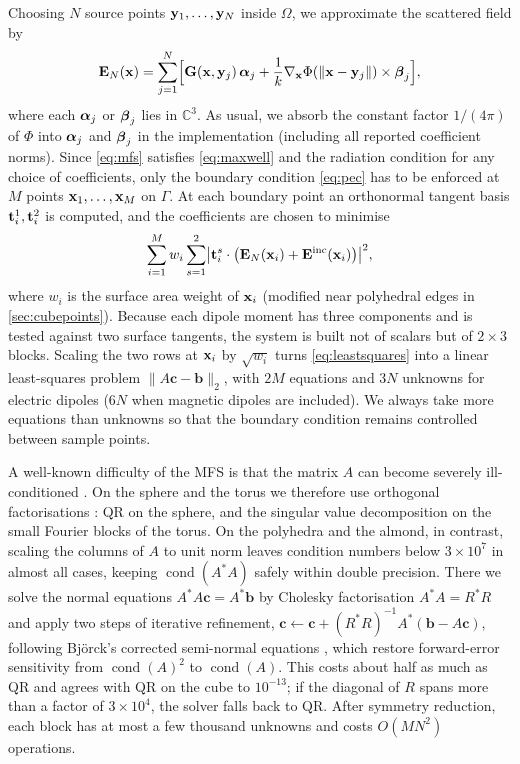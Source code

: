 Choosing $N$ source points $\mathbf{y}_1,\dots,\mathbf{y}_N$ inside $\Omega$, we approximate the scattered field by
\begin{equation}
  \mathbf{E}_N(\mathbf{x}) = \sum_{j=1}^{N}\Bigl[\mathbf{G}(\mathbf{x},\mathbf{y}_j)\,\boldsymbol{\alpha}_j + \frac{1}{k}\nabla_{\mathbf{x}}\Phi(\|\mathbf{x}-\mathbf{y}_j\|)\times\boldsymbol{\beta}_j\Bigr],
  \label{eq:mfs}
\end{equation}
where each $\boldsymbol{\alpha}_j$ or $\boldsymbol{\beta}_j$ lies in $\mathbb{C}^3$. As usual, we absorb the constant factor $1/(4\pi)$ of $\Phi$ into $\boldsymbol{\alpha}_j$ and $\boldsymbol{\beta}_j$ in the implementation (including all reported coefficient norms). Since \eqref{eq:mfs} satisfies \eqref{eq:maxwell} and the radiation condition for any choice of coefficients, only the boundary condition \eqref{eq:pec} has to be enforced at $M$ points $\mathbf{x}_1,\dots,\mathbf{x}_M$ on $\Gamma$. At each boundary point an orthonormal tangent basis $\mathbf{t}_i^{1},\mathbf{t}_i^{2}$ is computed, and the coefficients are chosen to minimise
\begin{equation}
  \sum_{i=1}^{M} w_i \sum_{s=1}^{2}\bigl|\mathbf{t}_i^{s}\cdot\bigl(\mathbf{E}_N(\mathbf{x}_i)+\mathbf{E}^{\mathrm{inc}}(\mathbf{x}_i)\bigr)\bigr|^2,
  \label{eq:leastsquares}
\end{equation}
where $w_i$ is the surface area weight of $\mathbf{x}_i$ (modified near polyhedral edges in \autoref{sec:cubepoints}). Because each dipole moment has three components and is tested against two surface tangents, the system is built not of scalars but of $2\times3$ blocks. Scaling the two rows at $\mathbf{x}_i$ by $\sqrt{w_i}$ turns \eqref{eq:leastsquares} into a linear least-squares problem $\|A\mathbf{c} - \mathbf{b}\|_2$, with $2M$ equations and $3N$ unknowns for electric dipoles ($6N$ when magnetic dipoles are included). We always take more equations than unknowns so that the boundary condition remains controlled between sample points.

A well-known difficulty of the MFS is that the matrix $A$ can become severely ill-conditioned \cite{fairweather1998,barnett2008}. On the sphere and the torus we therefore use orthogonal factorisations \cite{golub2013}: QR on the sphere, and the singular value decomposition on the small Fourier blocks of the torus. On the polyhedra and the almond, in contrast, scaling the columns of $A$ to unit norm leaves condition numbers below $3\times10^{7}$ in almost all cases, keeping $\operatorname{cond}(A^{*}A)$ safely within double precision. There we solve the normal equations $A^{*}A\mathbf{c} = A^{*}\mathbf{b}$ by Cholesky factorisation $A^{*}A = R^{*}R$ and apply two steps of iterative refinement, $\mathbf{c}\leftarrow\mathbf{c} + (R^{*}R)^{-1}A^{*}(\mathbf{b}-A\mathbf{c})$, following Bj\"orck's corrected semi-normal equations \cite{bjorck1987}, which restore forward-error sensitivity from $\operatorname{cond}(A)^2$ to $\operatorname{cond}(A)$. This costs about half as much as QR and agrees with QR on the cube to $10^{-13}$; if the diagonal of $R$ spans more than a factor of $3\times10^4$, the solver falls back to QR. After symmetry reduction, each block has at most a few thousand unknowns and costs $O(MN^2)$ operations.


